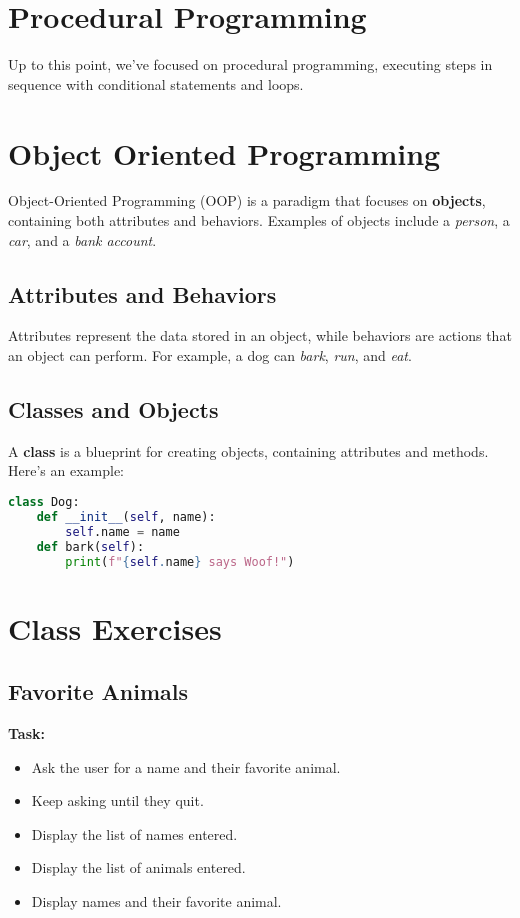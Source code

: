 \documentclass{article}
\begin{document}
\section{Procedural Programming}
Up to this point, we've focused on procedural programming, executing steps in sequence with conditional statements and loops.

\section{Object Oriented Programming}
Object-Oriented Programming (OOP) is a paradigm that focuses on \textbf{objects}, containing both attributes and behaviors. Examples of objects include a \textit{person}, a \textit{car}, and a \textit{bank account}.

\subsection{Attributes and Behaviors}
Attributes represent the data stored in an object, while behaviors are actions that an object can perform. For example, a dog can \textit{bark}, \textit{run}, and \textit{eat}.

\subsection{Classes and Objects}
A \textbf{class} is a blueprint for creating objects, containing attributes and methods. Here's an example:
\begin{lstlisting}[language=python]
class Dog:
    def __init__(self, name):
        self.name = name
    def bark(self):
        print(f"{self.name} says Woof!")
\end{lstlisting}
\newpage 
\section{Class Exercises }
\subsection{Favorite Animals}
\textbf{Task:}
\begin{itemize}
    \item Ask the user for a name and their favorite animal.
    \item Keep asking until they quit.
    \item Display the list of names entered.
    \item Display the list of animals entered.
    \item Display names and their favorite animal.
\end{itemize}
\end{document}
